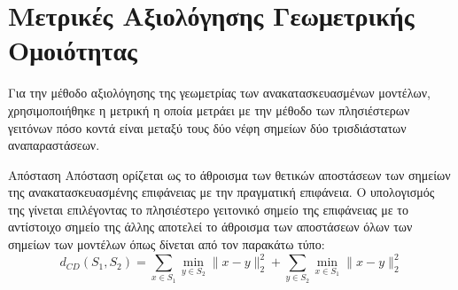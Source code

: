 \section{Μετρικές Αξιολόγησης Γεωμετρικής Ομοιότητας}
Για την μέθοδο αξιολόγησης της γεωμετρίας των ανακατασκευασμένων μοντέλων, χρησιμοποιήθηκε η μετρική  η οποία μετράει με την μέθοδο των πλησιέστερων γειτόνων πόσο κοντά είναι μεταξύ τους δύο νέφη σημείων δύο τρισδιάστατων αναπαραστάσεων.
\begin{definition}
    Απόσταση 
    Απόσταση  ορίζεται ως το άθροισμα των θετικών αποστάσεων των σημείων της  ανακατασκευασμένης επιφάνειας με την πραγματική επιφάνεια. Ο υπολογισμός της γίνεται επιλέγοντας το πλησιέστερο γειτονικό σημείο της επιφάνειας με το αντίστοιχο σημείο της άλλης αποτελεί το άθροισμα των αποστάσεων όλων των σημείων των  μοντέλων όπως δίνεται από τον παρακάτω τύπο:
    \begin{equation}
        d_{CD}(S_1, S_2) = \sum_{x \in S_1} \min_{y \in S_2} \lVert x - y \rVert_2^2 + \sum_{y \in S_2} \min_{x \in S_1} \lVert x - y \rVert_2^2
        \label{eq:chamfer_distance}
    \end{equation}
\end{definition}
